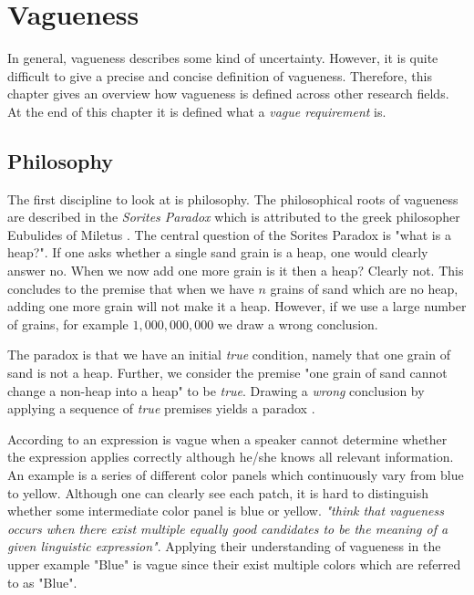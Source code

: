 \section{Vagueness}
\label{chp:fundamentals:sec:vagueness}
In general, vagueness describes some kind of uncertainty.
However, it is quite difficult to give a precise and concise definition of vagueness.
Therefore, this chapter gives an overview how vagueness is defined across other research fields.
At the end of this chapter it is defined what a \textit{vague requirement} is.

\subsection{Philosophy}
\label{chp:fundamentals:sec:vagueness:subsec:philosophy}

The first discipline to look at is philosophy.
The philosophical roots of vagueness are described in the \textit{Sorites Paradox} which is attributed to the greek philosopher Eubulides of Miletus \parencite{Barnes:1982}.
The central question of the Sorites Paradox is "what is a heap?".
If one asks whether a single sand grain is a heap, one would clearly answer no.
When we now add one more grain is it then a heap?
Clearly not.
This concludes to the premise that when we have $n$ grains of sand which are no heap, adding one more grain will not make it a heap.
However, if we use a large number of grains, for example $1,000,000,000$ we draw a wrong conclusion.

The paradox is that we have an initial \textit{true} condition, namely that one grain of sand is not a heap.
Further, we consider the premise "one grain of sand cannot change a non-heap into a heap" to be \textit{true}.
Drawing a \textit{wrong} conclusion by applying a sequence of \textit{true} premises yields a paradox \parencite{Sainsbury:2009}.

According to \textcite{Braun:2007} an expression is vague when a speaker cannot determine whether the expression applies correctly although he/she knows all relevant information.
An example is a series of different color panels which continuously vary from blue to yellow.
Although one can clearly see each patch, it is hard to distinguish whether some intermediate color panel is blue or yellow.
\Textcite{Braun:2007} \textit{"think that vagueness occurs when there exist multiple equally good candidates to be the meaning of a given linguistic expression"}.
Applying their understanding of vagueness in the upper example "Blue" is vague since their exist multiple colors which are referred to as "Blue".

